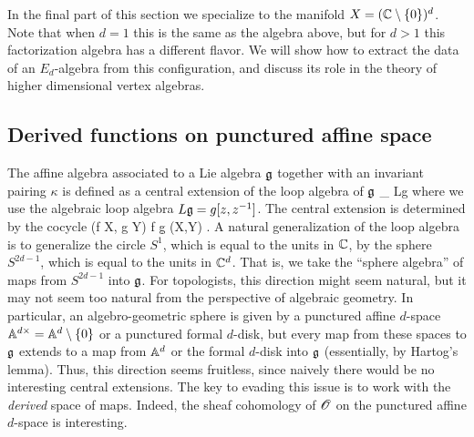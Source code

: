 \documentclass[10pt]{amsart}
\begin{document}
In the final part of this section we specialize to the manifold $X = (\CC \setminus \{0\})^d$. 
Note that when $d=1$ this is the same as the algebra above, but for $d>1$ this factorization algebra has a different flavor. 
We will show how to extract the data of an $E_d$-algebra from this configuration, and discuss its role in the theory of higher dimensional vertex algebras. 



\subsection{Derived functions on punctured affine space}

The affine algebra associated to a Lie algebra $\fg$ together with an invariant pairing $\kappa$ is defined as a central extension of the loop algebra of $\fg$
\ben
\CC \to \Hat{\fg}_{\kappa} \to Lg 
\een
where we use the algebraic loop algebra $L\fg = g [z,z^{-1}]$.
The central extension is determined by the cocycle 
\ben
(f \tensor X, g \tensor Y) \mapsto \oint f \d g \kappa(X,Y) .
\een 
A natural generalization of the loop algebra is to generalize the circle $S^1$, which is equal to the units in $\CC$, by the sphere $S^{2d-1}$, which is equal to the units in $\CC^d$.
That is, we take the ``sphere algebra'' of maps from $S^{2d-1}$ into $\fg$.
For topologists, this direction might seem natural,
but it may not seem too natural from the perspective of algebraic geometry.
In particular, an algebro-geometric sphere is given by a punctured affine $d$-space $\AA^{d\times} = \AA^d \setminus \{0\}$ or a punctured formal $d$-disk,
but every map from these spaces to $\fg$ extends to a map from $\AA^d$ or the formal $d$-disk into $\fg$ (essentially, by Hartog's lemma).
Thus, this direction seems fruitless, since naively there would be no interesting central extensions.
The key to evading this issue is to work with the {\em derived} space of maps. 
Indeed, the sheaf cohomology of $\sO$ on the punctured affine $d$-space is interesting. 
\end{document}
